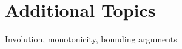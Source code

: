 \documentclass[../../main.tex]{subfiles}
\begin{document}
\section{Additional Topics}
Involution, monotonicity, bounding arguments
\end{document}
